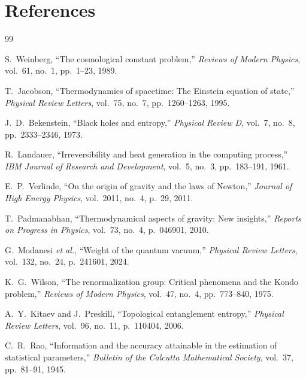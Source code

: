 \documentclass[11pt,a4paper]{article}
\begin{document}
\newpage
\section*{References}

\begin{thebibliography}{99}

S.~Weinberg, ``The cosmological constant problem,'' \textit{Reviews of Modern Physics}, vol.~61, no.~1, pp.~1--23, 1989.

T.~Jacobson, ``Thermodynamics of spacetime: The Einstein equation of state,'' \textit{Physical Review Letters}, vol.~75, no.~7, pp.~1260--1263, 1995.

J.~D.~Bekenstein, ``Black holes and entropy,'' \textit{Physical Review D}, vol.~7, no.~8, pp.~2333--2346, 1973.

R.~Landauer, ``Irreversibility and heat generation in the computing process,'' \textit{IBM Journal of Research and Development}, vol.~5, no.~3, pp.~183--191, 1961.

E.~P.~Verlinde, ``On the origin of gravity and the laws of Newton,'' \textit{Journal of High Energy Physics}, vol.~2011, no.~4, p.~29, 2011.

T.~Padmanabhan, ``Thermodynamical aspects of gravity: New insights,'' \textit{Reports on Progress in Physics}, vol.~73, no.~4, p.~046901, 2010.

G.~Modanesi \textit{et al.}, ``Weight of the quantum vacuum,'' \textit{Physical Review Letters}, vol.~132, no.~24, p.~241601, 2024.

K.~G.~Wilson, ``The renormalization group: Critical phenomena and the Kondo problem,'' \textit{Reviews of Modern Physics}, vol.~47, no.~4, pp.~773--840, 1975.

A.~Y.~Kitaev and J.~Preskill, ``Topological entanglement entropy,'' \textit{Physical Review Letters}, vol.~96, no.~11, p.~110404, 2006.

C.~R.~Rao, ``Information and the accuracy attainable in the estimation of statistical parameters,'' \textit{Bulletin of the Calcutta Mathematical Society}, vol.~37, pp.~81--91, 1945.


\end{thebibliography}
\end{document}
